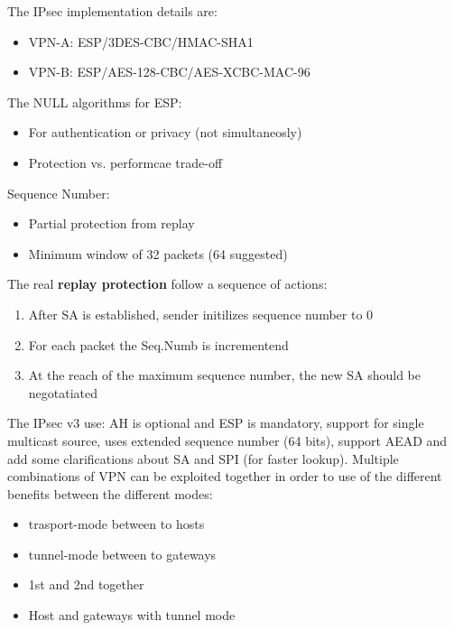 \documentclass[12pt]{article}
\begin{document}
The IPsec implementation details are:
\begin{itemize}
  \item VPN-A: ESP/3DES-CBC/HMAC-SHA1
  \item VPN-B: ESP/AES-128-CBC/AES-XCBC-MAC-96
\end{itemize}
The NULL algorithms for ESP:
\begin{itemize}
  \item For authentication or privacy (not simultaneosly)
  \item Protection vs. performcae trade-off
\end{itemize}
Sequence Number:
\begin{itemize}
  \item Partial protection from replay
  \item Minimum window of 32 packets (64 suggested)
\end{itemize}
The real \textbf{replay protection} follow a sequence of actions:
\begin{enumerate}
  \item After SA is established, sender initilizes sequence number to 0
  \item For each packet the Seq.Numb is incrementend
  \item At the reach of the maximum sequence number, the new SA should be negotatiated
\end{enumerate}

The IPsec v3 use: AH is optional and ESP is mandatory, support for single multicast source, uses extended sequence number (64 bits), support AEAD and add some clarifications about SA and SPI (for faster lookup).
Multiple combinations of VPN can be exploited together in order to use of the different benefits between the different modes:
\begin{itemize}
  \item trasport-mode between to hosts
  \item tunnel-mode between to gateways
  \item 1st and 2nd together
  \item Host and gateways with tunnel mode
\end{itemize}
\end{document}
